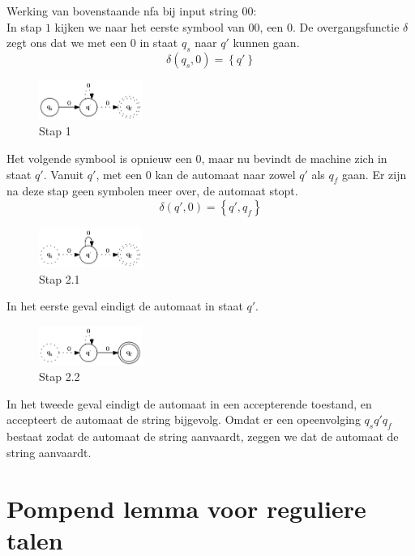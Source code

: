 \documentclass[main.tex]{subfiles}
\begin{document}
\begin{vb}
  Werking van bovenstaande nfa bij input string $00$:\\
  In stap $1$ kijken we naar het eerste symbool van $00$, een $0$.
  De overgangsfunctie $\delta$ zegt ons dat we met een $0$ in staat $q_{s}$ naar $q'$ kunnen gaan.
  \[ \delta(q_{s},0) = \left\{q'\right\} \]
  \begin{figure}[H]
    \centering
    \includegraphics[width=0.3\textwidth]{assets/nfa-vb2.png}
    \caption{Stap 1}
    \label{fig:nfa-vb2}
  \end{figure}
  Het volgende symbool is opnieuw een $0$, maar nu bevindt de machine zich in staat $q'$.
  Vanuit $q'$, met een $0$ kan de automaat naar zowel $q'$ als $q_{f}$ gaan.
  Er zijn na deze stap geen symbolen meer over, de automaat stopt.
  \[ \delta(q',0) = \left\{q',q_{f}\right\} \]
  \begin{figure}[H]
    \centering
    \includegraphics[width=0.3\textwidth]{assets/nfa-vb3.png}
    \caption{Stap 2.1}
    \label{fig:nfa-vb3}
  \end{figure}
  In het eerste geval eindigt de automaat in staat $q'$.
  \begin{figure}[H]
    \centering
    \includegraphics[width=0.3\textwidth]{assets/nfa-vb4.png}
    \caption{Stap 2.2}
    \label{fig:nfa-vb4}
  \end{figure}
  In het tweede geval eindigt de automaat in een accepterende toestand, en accepteert de automaat de string bijgevolg.
  Omdat er een opeenvolging $q_{s}q'q_{f}$ bestaat zodat de automaat de string aanvaardt, zeggen we dat de automaat de string aanvaardt.
\end{vb}


\section{Pompend lemma voor reguliere talen}
\label{sec:pompend-lemma-voor-reguliere-talen}
\end{document}
